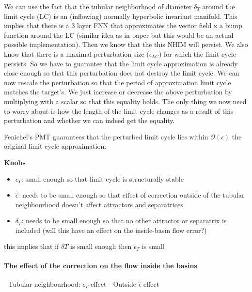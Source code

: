 \documentclass{article}
\theoremstyle{definition}
\theoremstyle{remark}
\newcounter{ct}
\begin{document}
We can use the fact that the tubular neighborhood of diameter $\delta_T$ around the limit cycle (LC) is an (inflowing) normally hyperbolic invariant manifold.
This implies that there is a 3 layer FNN that approximates the vector field x a bump function around the LC (similar idea as in paper but this would be an actual possible implementation).
Then we know that the this NHIM will persist.
We also know that there is a maximal perturbation size ($\epsilon_{LC}$) for which the limit cycle persists.
So we have to guarantee that the limit cycle approximation is already close enough so that this perturbation does not destroy the limit cycle.
We can now rescale the perturbation so that the period of approximation limit cycle matches the target's. 
We just increase or decrease  the above perturbation by multiplying with a scalar so that this equality holds.
The only thing we now need to worry about is how the length of the limit cycle changes as a result of this perturbation and whether we can indeed get the equality.

Fenichel's PMT guarantees that the perturbed limit cycle lies within $\mathcal{O}(\epsilon)$ the original limit cycle approximation.




\textbf{Knobs}
\begin{itemize}
\item $\epsilon_T$: small enough so that limit cycle is structurally stable
\item $\hat\epsilon$: needs to be small enough so that effect of correction outside of the tubular neighbourhood doesn't affect attractors and separatrices
\item $\delta_T$: needs to be small enough so that no other attractor or separatrix is included (will this have an effect on the inside-basin flow error?)
\end{itemize}

this implies that if $\delta T$ is small enough then $\epsilon_T$ is small

\paragraph{The effect of the correction on the flow inside the basins}
- Tubular neighbourhood: $\epsilon_T$ effect
- Outside $\hat\epsilon$ effect
\end{document}
